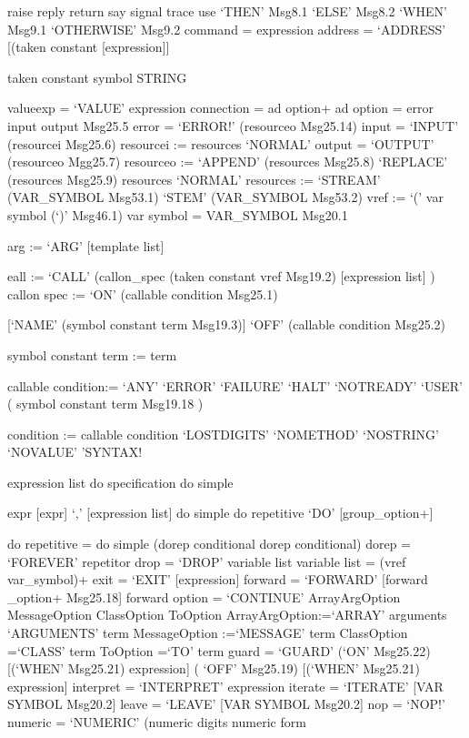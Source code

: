 raise \textbar{} reply \textbar{} return \textbar{} say \textbar{}
signal \textbar{} trace \textbar{} use `THEN' Msg8.1 `ELSE' Msg8.2
`WHEN' Msg9.1 \textbar{} `OTHERWISE' Msg9.2 command = expression address
= `ADDRESS' {[}(taken constant {[}expression{]}{]}

taken constant symbol \textbar{} STRING

valueexp = `VALUE' expression connection = ad option+ ad option = error
\textbar{} input \textbar{} output \textbar{} Msg25.5 error = `ERROR!'
(resourceo \textbar{} Msg25.14) input = `INPUT' (resourcei \textbar{}
Msg25.6) resourcei := resources \textbar{} `NORMAL' output = `OUTPUT'
(resourceo \textbar{} Mgg25.7) resourceo := `APPEND' (resources
\textbar{} Msg25.8) \textbar{} `REPLACE' (resources \textbar{} Msg25.9)
\textbar{} resources \textbar{} `NORMAL' resources := `STREAM'
(VAR\_SYMBOL \textbar{} Msg53.1) \textbar{} `STEM' (VAR\_SYMBOL
\textbar{} Msg53.2) vref := `(' var symbol (`)' \textbar{} Msg46.1) var
symbol = VAR\_SYMBOL \textbar{} Msg20.1

arg := `ARG' {[}template list{]}

eall := `CALL' (callon\_spec \textbar{} (taken constant \textbar{} vref
\textbar{} Msg19.2) {[}expression list{]} ) callon spec := `ON'
(callable condition \textbar{} Msg25.1)

{[}`NAME' (symbol constant term \textbar{} Msg19.3){]} \textbar{} `OFF'
(callable condition \textbar{} Msg25.2)

symbol constant term := term

callable condition:= `ANY' \textbar{} `ERROR' \textbar{} `FAILURE'
\textbar{} `HALT' \textbar{} `NOTREADY' \textbar{} `USER' ( symbol
constant term \textbar{} Msg19.18 )

condition := callable condition \textbar{} `LOSTDIGITS' \textbar{}
`NOMETHOD' \textbar{} `NOSTRING' \textbar{} `NOVALUE' \textbar{}
'SYNTAX!

expression list do specification do simple

expr \textbar{} {[}expr{]} `,' {[}expression list{]} do simple
\textbar{} do repetitive `DO' {[}group\_option+{]}

do repetitive = do simple (dorep \textbar{} conditional \textbar{} dorep
conditional) dorep = `FOREVER' \textbar{} repetitor drop = `DROP'
variable list variable list = (vref \textbar{} var\_symbol)+ exit =
`EXIT' {[}expression{]} forward = `FORWARD' {[}forward \_option+
\textbar{} Msg25.18{]} forward option = `CONTINUE' \textbar{}
ArrayArgOption \textbar{} MessageOption \textbar{} ClassOption
\textbar{} ToOption ArrayArgOption:=`ARRAY' arguments \textbar{}
`ARGUMENTS' term MessageOption :=`MESSAGE' term ClassOption =`CLASS'
term ToOption =`TO' term guard = `GUARD' (`ON' \textbar{} Msg25.22)
{[}(`WHEN' \textbar{} Msg25.21) expression{]} \textbar{} ( `OFF'
\textbar{} Msg25.19) {[}(`WHEN' \textbar{} Msg25.21) expression{]}
interpret = `INTERPRET' expression iterate = `ITERATE' {[}VAR SYMBOL
\textbar{} Msg20.2{]} leave = `LEAVE' {[}VAR SYMBOL \textbar{}
Msg20.2{]} nop = `NOP!' numeric = `NUMERIC' (numeric digits \textbar{}
numeric form


